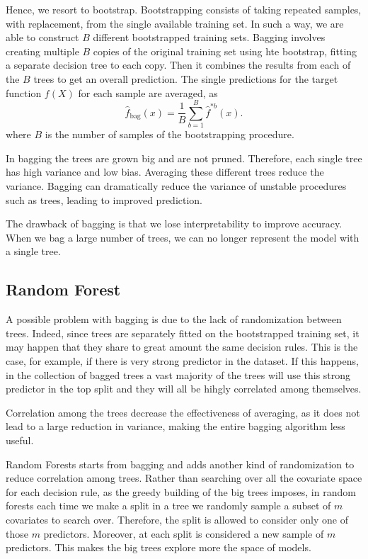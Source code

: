 \documentclass[a4paper,11pt]{article}
\begin{document}
Hence, we resort to bootstrap. Bootstrapping consists of taking repeated samples, with replacement, from the single available training set. In such a way, we are able to construct $B$ different bootstrapped training sets. Bagging involves creating multiple $B$ copies of the original training set using hte bootstrap, fitting a separate decision tree to each copy. Then it combines the results from each of the $B$ trees to get an overall prediction.
The single predictions for the target function $f(X)$ for each sample are averaged, as
\begin{equation}
  \label{eq_bagging}
  \hat{f}_{\text{bag}}(x) = \frac{1}{B} \sum_{b=1}^{B} \hat{f}^{*b}(x).
\end{equation}
where $B$ is the number of samples of the bootstrapping procedure.

In bagging the trees are grown big and are not pruned. Therefore, each single tree has high variance and low bias. Averaging these different trees reduce the variance.  Bagging can dramatically reduce the variance of unstable procedures such
as trees, leading to improved prediction. 

The drawback of bagging is that we lose interpretability to improve accuracy. When we bag a large number of trees, we can no longer represent the model with a single tree.

\subsection{Random Forest}
A possible problem with bagging is due to the lack of randomization between trees. Indeed, since trees are separately fitted on the bootstrapped training set, it may happen that they share to great amount the same decision rules. This is the case, for example, if there is very strong predictor in the dataset. If this happens, in the collection of bagged trees a vast majority of the trees will use this strong predictor in the top split and they will all be hihgly correlated among themselves.

Correlation among the trees decrease the effectiveness of averaging, as it does not lead to a large reduction in variance, making the entire bagging algorithm less useful. 

 Random Forests starts from bagging and adds another kind of randomization to reduce correlation among trees. Rather than searching over all the covariate space for each decision rule, as the greedy building of the big trees imposes, in random forests each time we make a split in a tree we randomly sample a subset of $m$ covariates to search over. Therefore, the split is allowed to consider only one of those $m$ predictors. Moreover, at each split is considered a new sample of $m$ predictors. This makes the big trees explore more the space of models.
 
\end{document}

